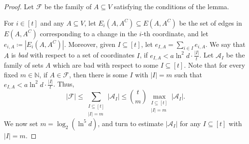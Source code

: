 \documentclass[notitlepage]{scrartcl}
\begin{document}
\begin{proof}
Let $\mathcal{F}$ be the family of $A\subseteq V$ satisfying the conditions of the lemma.

For $i\in [t]$ and any $A\subseteq V$, let $E_i(A,A^C)\subseteq E(A,A^C)$ be the set of edges in $E(A,A^C)$ corresponding to a change in the $i$-th coordinate, and let $e_{i,A}\coloneqq |E_i(A,A^C)|$. Moreover, given $I\subseteq [t]$, let $e_{I,A}=\sum_{i\in I}e_{i,A}$. We say that $A$ is \textit{bad} with respect to a set of coordinates $I$, if $e_{I,A}< a\ln^2d\cdot \frac{|I|}{t}$. Let $\mathcal{A}_{I}$ be the family of sets $A$ which are bad with respect to some $I\subseteq [t]$. Note that for every fixed $m \in \mathbb{N}$, if $A\in \mathcal{F}$, then there is some $I$ with $|I|=m$ such that $e_{I,A}< a\ln^2d\cdot \frac{|I|}{t}$. Thus,
\[|\mathcal{F}|\le \sum_{\substack{I \subseteq [t]\\|I|=m}} |\mathcal{A}_I| \leq \binom{t}{m} \max_{\substack{I \subseteq [t]\\|I|=m}} |\mathcal{A}_I|.\]
We now set $m=\log_2\left(\ln^5 d\right)$, and turn to estimate $|\mathcal{A}_I|$ for any $I \subseteq [t]$ with $|I|=m$.


\end{proof}
\end{document}
